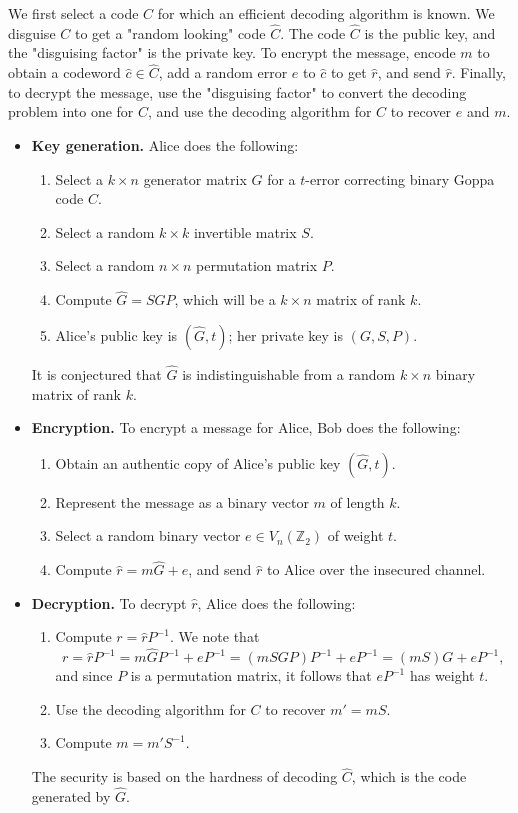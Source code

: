 \documentclass[10pt]{article}
\newcommand{\Z}{\mathbb{Z}}
\theoremstyle{newstyle}
\begin{document}
We first select a code $C$ for which an efficient decoding algorithm is known. 
We disguise $C$ to get a "random looking" code $\hat C$. The code $\hat C$ is the public key,
and the "disguising factor" is the private key. To encrypt the message, encode 
$m$ to obtain a codeword $\hat c \in \hat C$, add a random error $e$ to $\hat c$ to get 
$\hat r$, and send $\hat r$. Finally, to decrypt the message, use the "disguising factor" 
to convert the decoding problem into one for $C$, and use the decoding algorithm for $C$ 
to recover $e$ and $m$. 
\newpage 
\begin{itemize}
    \item {\bf Key generation.} Alice does the following: 
    \begin{enumerate}
        \item Select a $k \times n$ generator matrix $G$ for a $t$-error correcting binary Goppa code $C$.
        \item Select a random $k \times k$ invertible matrix $S$. 
        \item Select a random $n \times n$ permutation matrix $P$. 
        \item Compute $\hat G = SGP$, which will be a $k \times n$ matrix of rank $k$. 
        \item Alice's public key is $(\hat G, t)$; her private key is $(G, S, P)$. 
    \end{enumerate}
    It is conjectured that $\hat G$ is indistinguishable from a random $k \times n$ binary 
    matrix of rank $k$. 
    \item {\bf Encryption.} To encrypt a message for Alice, Bob does the following:
    \begin{enumerate}
        \item Obtain an authentic copy of Alice's public key $(\hat G, t)$. 
        \item Represent the message as a binary vector $m$ of length $k$. 
        \item Select a random binary vector $e \in V_n(\Z_2)$ of weight $t$. 
        \item Compute $\hat r = m\hat G + e$, and send $\hat r$ to Alice over the insecured channel.
    \end{enumerate}
    \item {\bf Decryption.} To decrypt $\hat r$, Alice does the following:
    \begin{enumerate}
        \item Compute $r = \hat r P^{-1}$. We note that 
        \[ r = \hat r P^{-1} = m \hat G P^{-1} + eP^{-1} = (mSGP)P^{-1} + eP^{-1} = (mS)G + eP^{-1}, \]
        and since $P$ is a permutation matrix, it follows that $eP^{-1}$ has weight $t$. 
        \item Use the decoding algorithm for $C$ to recover $m' = mS$. 
        \item Compute $m = m'S^{-1}$. 
    \end{enumerate}
    The security is based on the hardness of decoding $\hat C$, which is the code generated by $\hat G$. 
\end{itemize}
\end{document}
